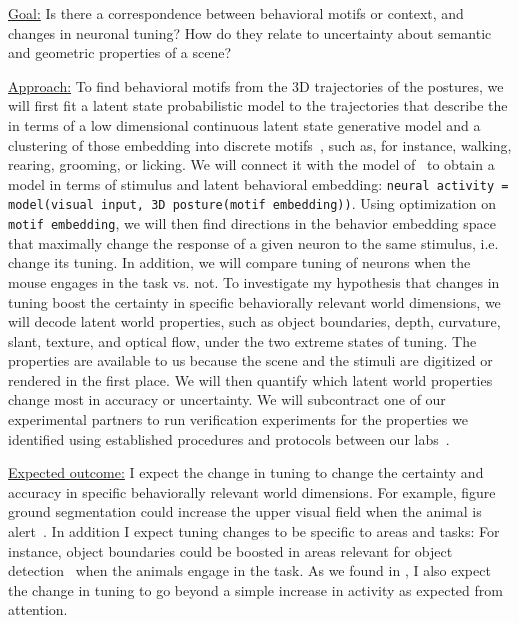 \documentclass[COG,11pt]{ercgrant}
\begin{document}
\underline{Goal:} Is there a correspondence between behavioral motifs or context, and changes in neuronal tuning? How do they relate to uncertainty about semantic and geometric properties of a scene?

\underline{Approach:}
To find behavioral motifs from the 3D trajectories of the postures, we will first fit a latent state probabilistic model to the trajectories that describe the in terms of a low dimensional continuous latent state generative model and a clustering of those embedding into discrete motifs~\parencite{Wiltschko2015-ey, Wiltschko2020-zd}, such as, for instance, walking, rearing, grooming, or licking.
We will connect it with the model of~ to obtain a model in terms of stimulus and latent behavioral embedding: \texttt{neural activity = model(visual input, 3D posture(motif embedding))}.
Using optimization on \texttt{motif embedding}, we will then find directions in the behavior embedding space that maximally change the response of a given neuron to the same stimulus, i.e. change its tuning.
In addition, we will compare tuning of neurons when the mouse engages in the task vs. not.
To investigate my hypothesis that changes in tuning boost the certainty in specific behaviorally relevant world dimensions, we will decode latent world properties, such as object boundaries, depth, curvature, slant, texture, and optical flow, under the two extreme states of tuning. 
The properties are available to us because the scene and the stimuli are digitized or rendered in the first place.
We will then quantify which latent world properties change most in accuracy or uncertainty.
We will subcontract one of our experimental partners to run verification experiments for the properties we identified using established procedures and protocols between our labs~\parencite[used in \textit{e.g.}][]{Walker2019-yw, Franke2022-do}.

\underline{Expected outcome:} 
I expect the change in tuning to change the certainty and accuracy in specific behaviorally relevant world dimensions.
For example, figure ground segmentation could increase the upper visual field when the animal is alert~\parencite[similar to findings in ][]{Franke2022-do}.
In addition I expect tuning changes to be specific to areas and tasks: For instance, object boundaries could be boosted in areas relevant for object detection~\parencite{Froudarakis2019-yt} when the animals engage in the task.
As we found in \textcite{Franke2022-do}, I also expect the change in tuning to go beyond a simple increase in activity as expected from attention.
\end{document}

